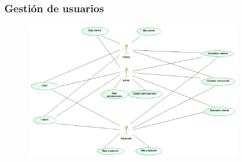 \subsubsection{Gestión de usuarios}%
\begin{figure}[H]
	\centering
	\includegraphics[width = 0.8\textwidth]{Use_Cases/Gestion_Usuarios.png}
\end{figure}
\newpage

